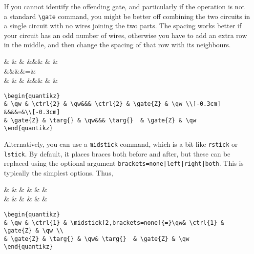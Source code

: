 \documentclass[aps,pra,10pt,nofootinbib]{revtex4}
\begin{document}
If you cannot identify the offending gate, and particularly if the operation is not a standard \verb!\gate! command, you might be better off combining the two circuits in a single circuit with no wires joining the two parts. The spacing works better if your circuit has an odd number of wires, otherwise you have to add an extra row in the middle, and then change the spacing of that row with its neighbours.
\begin{Code}
\begin{center}
\begin{quantikz}
& \qw &  & \qw&&&  &  & \qw \\[-0.3cm]
&&&&=&\\[-0.3cm]
&  & \targ{} & \qw&&& \targ{}  &  & \qw
\end{quantikz}
\end{center}
\tcblower
\begin{lstlisting}
\begin{quantikz}
& \qw & \ctrl{2} & \qw&&& \ctrl{2} & \gate{Z} & \qw \\[-0.3cm]
&&&&=&\\[-0.3cm]
& \gate{Z} & \targ{} & \qw&&& \targ{}  & \gate{Z} & \qw
\end{quantikz}
\end{lstlisting}
\end{Code}
Alternatively, you can use a \texttt{midstick} command, which is a bit like \texttt{rstick} or \texttt{lstick}. By default, it places braces both before and after, but these can be replaced using the optional argument \texttt{brackets=none|left|right|both}. This is typically the simplest options. Thus,
\begin{Code}
\begin{center}
\begin{quantikz}
& \qw &  & \midstick[2,brackets=none]{=}\qw&  &  & \qw \\
&  & \targ{} & \qw& \targ{}  &  & \qw
\end{quantikz}
\end{center}
\tcblower
\begin{lstlisting}
\begin{quantikz}
& \qw & \ctrl{1} & \midstick[2,brackets=none]{=}\qw& \ctrl{1} & \gate{Z} & \qw \\
& \gate{Z} & \targ{} & \qw& \targ{}  & \gate{Z} & \qw
\end{quantikz}
\end{lstlisting}
\end{Code}
\end{document}
